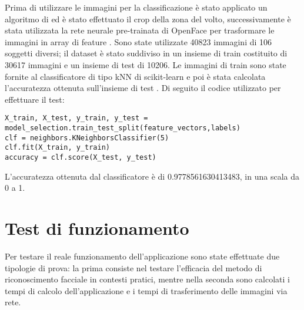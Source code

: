 Prima di utilizzare le immagini per la classificazione è stato applicato un algoritmo di  ed è stato effettuato il crop della zona del volto, successivamente è stata utilizzata la rete neurale pre-trainata di OpenFace per trasformare le immagini in array di feature \cite{amos2016openface}. Sono state utilizzate 40823 immagini di 106 soggetti diversi; il dataset è stato suddiviso in un insieme di train costituito di 30617 immagini e un insieme di test di 10206. Le immagini di train sono state fornite al classificatore di tipo kNN di scikit-learn e poi è stata calcolata l'accuratezza ottenuta sull'insieme di test \cite{scikit-learn}. Di seguito il codice utilizzato per effettuare il test:

\begin{lstlisting}
X_train, X_test, y_train, y_test = 
model_selection.train_test_split(feature_vectors,labels)                       
clf = neighbors.KNeighborsClassifier(5)
clf.fit(X_train, y_train)
accuracy = clf.score(X_test, y_test)
\end{lstlisting}
L'accuratezza ottenuta dal classificatore è di 0.9778561630413483, in una scala da 0 a 1.


\section{Test di funzionamento}
Per testare il reale funzionamento dell'applicazione sono state effettuate due tipologie di prova: la prima consiste nel testare l'efficacia del metodo di riconoscimento facciale in contesti pratici, mentre nella seconda sono calcolati i tempi di calcolo dell'applicazione e i tempi di trasferimento delle immagini via rete.

